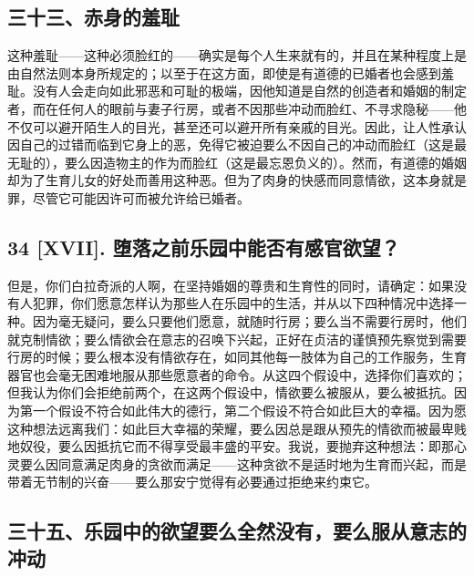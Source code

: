 
\subsection{三十三、赤身的羞耻}

这种羞耻——这种必须脸红的——确实是每个人生来就有的，并且在某种程度上是由自然法则本身所规定的；以至于在这方面，即使是有道德的已婚者也会感到羞耻。没有人会走向如此邪恶和可耻的极端，因他知道是自然的创造者和婚姻的制定者，而在任何人的眼前与妻子行房，或者不因那些冲动而脸红、不寻求隐秘——他不仅可以避开陌生人的目光，甚至还可以避开所有亲戚的目光。因此，让人性承认因自己的过错而临到它身上的恶，免得它被迫要么不因自己的冲动而脸红（这是最无耻的），要么因造物主的作为而脸红（这是最忘恩负义的）。然而，有道德的婚姻却为了生育儿女的好处而善用这种恶。但为了肉身的快感而同意情欲，这本身就是罪，尽管它可能因许可而被允许给已婚者。\par


\subsection{34 [XVII]. 堕落之前乐园中能否有感官欲望？}

但是，你们白拉奇派的人啊，在坚持婚姻的尊贵和生育性的同时，请确定：如果没有人犯罪，你们愿意怎样认为那些人在乐园中的生活，并从以下四种情况中选择一种。因为毫无疑问，要么只要他们愿意，就随时行房；要么当不需要行房时，他们就克制情欲；要么情欲会在意志的召唤下兴起，正好在贞洁的谨慎预先察觉到需要行房的时候；要么根本没有情欲存在，如同其他每一肢体为自己的工作服务，生育器官也会毫无困难地服从那些愿意者的命令。从这四个假设中，选择你们喜欢的；但我认为你们会拒绝前两个，在这两个假设中，情欲要么被服从，要么被抵抗。因为第一个假设不符合如此伟大的德行，第二个假设不符合如此巨大的幸福。因为愿这种想法远离我们：如此巨大幸福的荣耀，要么因总是跟从预先的情欲而被最卑贱地奴役，要么因抵抗它而不得享受最丰盛的平安。我说，要抛弃这种想法：即那心灵要么因同意满足肉身的贪欲而满足——这种贪欲不是适时地为生育而兴起，而是带着无节制的兴奋——要么那安宁觉得有必要通过拒绝来约束它。\par


\subsection{三十五、乐园中的欲望要么全然没有，要么服从意志的冲动}

